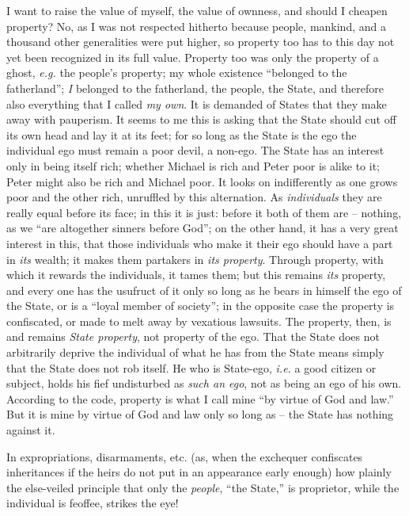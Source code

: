 I want to raise the value of myself, the value of ownness, and should I 
cheapen property? No, as I was not respected hitherto because people, mankind, 
and a thousand other generalities were put higher, so property too has to this 
day not yet been recognized in its full value. Property too was only the 
property of a ghost, \textit{e.g.} the people's property; my whole existence 
``belonged to the fatherland''; \textit{I} belonged to the fatherland, the 
people, the State, and therefore also everything that I called \textit{my 
own}. It is demanded of States that they make away with pauperism. It seems to 
me this is asking that the State should cut off its own head and lay it at its 
feet; for so long as the State is the ego the individual ego must remain a 
poor devil, a non-ego. The State has an interest only in being itself rich; 
whether Michael is rich and Peter poor is alike to it; Peter might also be 
rich and Michael poor. It looks on indifferently as one grows poor and the 
other rich, unruffled by this alternation. As \textit{individuals} they are 
really equal before its face; in this it is just: before it both of them are  -- nothing, as we ``are altogether sinners before God''; on the other hand, 
it has a very great interest in this, that those individuals who make it their 
ego should have a part in \textit{its} wealth; it makes them partakers in 
\textit{its property}. Through property, with which it rewards the 
individuals, it tames them; but this remains \textit{its} property, and every 
one has the usufruct of it only so long as he bears in himself the ego of the 
State, or is a ``loyal member of society''; in the opposite case the 
property is confiscated, or made to melt away by vexatious lawsuits. The 
property, then, is and remains \textit{State property}, not property of the 
ego. That the State does not arbitrarily deprive the individual of what he has 
from the State means simply that the State does not rob itself. He who is 
State-ego, \textit{i.e.} a good citizen or subject, holds his fief undisturbed 
as \textit{such an ego}, not as being an ego of his own. According to the 
code, property is what I call mine ``by virtue of God and law.'' But it is 
mine by virtue of God and law only so long as -- the State has nothing against 
it.

In expropriations, disarmaments, etc. (as, when the exchequer confiscates 
inheritances if the heirs do not put in an appearance early enough) how 
plainly the else-veiled principle that only the \textit{people}, ``the 
State,'' is proprietor, while the individual is feoffee, strikes the eye!

